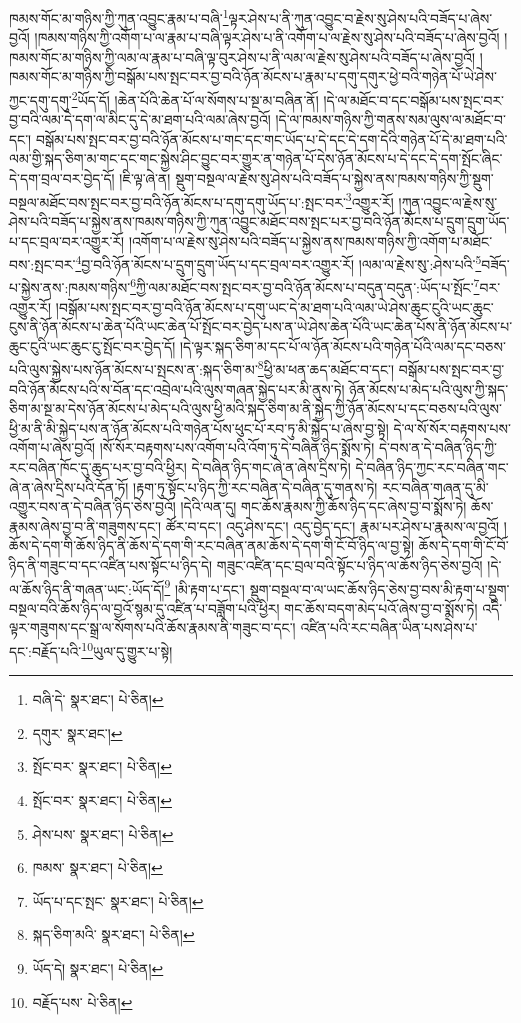 ཁམས་གོང་མ་གཉིས་ཀྱི་ཀུན་འབྱུང་རྣམ་པ་བཞི་\footnote{བཞི་དེ་  སྣར་ཐང་།  པེ་ཅིན། }ལྟར་ཤེས་པ་ནི་ཀུན་འབྱུང་བ་རྗེས་སུ་ཤེས་པའི་བཟོད་པ་ཞེས་བྱའོ། །ཁམས་གཉིས་ཀྱི་འགོག་པ་ལ་རྣམ་པ་བཞི་ལྟར་ཤེས་པ་ནི་འགོག་པ་ལ་རྗེས་སུ་ཤེས་པའི་བཟོད་པ་ཞེས་བྱའོ། །ཁམས་གོང་མ་གཉིས་ཀྱི་ལམ་ལ་རྣམ་པ་བཞི་ལྟ་བུར་ཤེས་པ་ནི་ལམ་ལ་རྗེས་སུ་ཤེས་པའི་བཟོད་པ་ཞེས་བྱའོ། །ཁམས་གོང་མ་གཉིས་ཀྱི་བསྒོམ་པས་སྤང་བར་བྱ་བའི་ཉོན་མོངས་པ་རྣམ་པ་དགུ་དགུར་ཕྱེ་བའི་གཉེན་པོ་ཡེ་ཤེས་ཀྱང་དགུ་དགུ་\footnote{དགུར་  སྣར་ཐང་། }ཡོད་དོ། །ཆེན་པོའི་ཆེན་པོ་ལ་སོགས་པ་སྔ་མ་བཞིན་ནོ། །དེ་ལ་མཐོང་བ་དང་བསྒོམ་པས་སྤང་བར་བྱ་བའི་ལམ་དེ་དག་ལ་མིང་དུ་དེ་མ་ཐག་པའི་ལམ་ཞེས་བྱའོ། །དེ་ལ་ཁམས་གཉིས་ཀྱི་གནས་སམ་ལུས་ལ་མཐོང་བ་དང་། བསྒོམ་པས་སྤང་བར་བྱ་བའི་ཉོན་མོངས་པ་གང་དང་གང་ཡོད་པ་དེ་དང་དེ་དག་དེའི་གཉེན་པོ་དེ་མ་ཐག་པའི་ལམ་གྱི་སྐད་ཅིག་མ་གང་དང་གང་སྐྱེས་ཤིང་བྱུང་བར་གྱུར་ན་གཉེན་པོ་དེས་ཉོན་མོངས་པ་དེ་དང་དེ་དག་སྤོང་ཞིང་དེ་དག་བྲལ་བར་བྱེད་དོ། །ཇི་ལྟ་ཞེ་ན། སྡུག་བསྔལ་ལ་རྗེས་སུ་ཤེས་པའི་བཟོད་པ་སྐྱེས་ནས་ཁམས་གཉིས་ཀྱི་སྡུག་བསྔལ་མཐོང་བས་སྤང་བར་བྱ་བའི་ཉོན་མོངས་པ་དགུ་དགུ་ཡོད་པ་:སྤང་བར་\footnote{སྤོང་བར་  སྣར་ཐང་།  པེ་ཅིན། }འགྱུར་རོ། །ཀུན་འབྱུང་ལ་རྗེས་སུ་ཤེས་པའི་བཟོད་པ་སྐྱེས་ནས་ཁམས་གཉིས་ཀྱི་ཀུན་འབྱུང་མཐོང་བས་སྤང་པར་བྱ་བའི་ཉོན་མོངས་པ་དྲུག་དྲུག་ཡོད་པ་དང་བྲལ་བར་འགྱུར་རོ། །འགོག་པ་ལ་རྗེས་སུ་ཤེས་པའི་བཟོད་པ་སྐྱེས་ནས་ཁམས་གཉིས་ཀྱི་འགོག་པ་མཐོང་བས་:སྤང་བར་\footnote{སྤོང་བར་  སྣར་ཐང་།  པེ་ཅིན། }བྱ་བའི་ཉོན་མོངས་པ་དྲུག་དྲུག་ཡོད་པ་དང་བྲལ་བར་འགྱུར་རོ། །ལམ་ལ་རྗེས་སུ་:ཤེས་པའི་\footnote{ཤེས་པས་  སྣར་ཐང་།  པེ་ཅིན། }བཟོད་པ་སྐྱེས་ནས་:ཁམས་གཉིས་\footnote{ཁམས་  སྣར་ཐང་།  པེ་ཅིན། }ཀྱི་ལམ་མཐོང་བས་སྤང་བར་བྱ་བའི་ཉོན་མོངས་པ་བདུན་བདུན་:ཡོད་པ་སྤོང་\footnote{ཡོད་པ་དང་སྤང་  སྣར་ཐང་།  པེ་ཅིན། }བར་འགྱུར་རོ། །བསྒོམ་པས་སྤང་བར་བྱ་བའི་ཉོན་མོངས་པ་དགུ་ཡང་དེ་མ་ཐག་པའི་ལམ་ཡེ་ཤེས་ཆུང་ངུའི་ཡང་ཆུང་ངུས་ནི་ཉོན་མོངས་པ་ཆེན་པོའི་ཡང་ཆེན་པོ་སྤོང་བར་བྱེད་པས་ན་ཡེ་ཤེས་ཆེན་པོའི་ཡང་ཆེན་པོས་ནི་ཉོན་མོངས་པ་ཆུང་ངུའི་ཡང་ཆུང་ངུ་སྤོང་བར་བྱེད་དོ། །དེ་ལྟར་སྐད་ཅིག་མ་དང་པོ་ལ་ཉོན་མོངས་པའི་གཉེན་པོའི་ལམ་དང་བཅས་པའི་ལུས་སྐྱེས་པས་ཉོན་མོངས་པ་སྤངས་ན་:སྐད་ཅིག་མ་\footnote{སྐད་ཅིག་མའི་  སྣར་ཐང་།  པེ་ཅིན། }ཕྱི་མ་ཕན་ཆད་མཐོང་བ་དང་། བསྒོམ་པས་སྤང་བར་བྱ་བའི་ཉོན་མོངས་པའི་ས་བོན་དང་འབྲེལ་པའི་ལུས་གཞན་སྐྱེད་པར་མི་ནུས་ཏེ། ཉོན་མོངས་པ་མེད་པའི་ལུས་ཀྱི་སྐད་ཅིག་མ་སྔ་མ་དེས་ཉོན་མོངས་པ་མེད་པའི་ལུས་ཕྱི་མའི་སྐད་ཅིག་མ་ནི་སྐྱེད་ཀྱི་ཉོན་མོངས་པ་དང་བཅས་པའི་ལུས་ཕྱི་མ་ནི་མི་སྐྱེད་པས་ན་ཉོན་མོངས་པའི་གཉེན་པོས་ཕུང་པོ་རབ་ཏུ་མི་སྐྱེད་པ་ཞེས་བྱ་སྟེ། དེ་ལ་སོ་སོར་བརྟགས་པས་འགོག་པ་ཞེས་བྱའོ། །སོ་སོར་བརྟགས་པས་འགོག་པའི་འོག་ཏུ་དེ་བཞིན་ཉིད་སྨོས་ཏེ། དེ་བས་ན་དེ་བཞིན་ཉིད་ཀྱི་རང་བཞིན་ཁོང་དུ་ཆུད་པར་བྱ་བའི་ཕྱིར། དེ་བཞིན་ཉིད་གང་ཞེ་ན་ཞེས་དྲིས་ཏེ། དེ་བཞིན་ཉིད་ཀྱང་རང་བཞིན་གང་ཞེ་ན་ཞེས་དྲིས་པའི་དོན་ཏོ། །རྟག་ཏུ་སྟོང་པ་ཉིད་ཀྱི་རང་བཞིན་དེ་བཞིན་དུ་གནས་ཏེ། རང་བཞིན་གཞན་དུ་མི་འགྱུར་བས་ན་དེ་བཞིན་ཉིད་ཅེས་བྱའོ། །དེའི་ལན་དུ། གང་ཆོས་རྣམས་ཀྱི་ཆོས་ཉིད་དང་ཞེས་བྱ་བ་སྨོས་ཏེ། ཆོས་རྣམས་ཞེས་བྱ་བ་ནི་གཟུགས་དང་། ཚོར་བ་དང་། འདུ་ཤེས་དང་། འདུ་བྱེད་དང་། རྣམ་པར་ཤེས་པ་རྣམས་ལ་བྱའོ། །ཆོས་དེ་དག་གི་ཆོས་ཉིད་ནི་ཆོས་དེ་དག་གི་རང་བཞིན་ནམ་ཆོས་དེ་དག་གི་ངོ་བོ་ཉིད་ལ་བྱ་སྟེ། ཆོས་དེ་དག་གི་ངོ་བོ་ཉིད་ནི་གཟུང་བ་དང་འཛིན་པས་སྟོང་པ་ཉིད་དེ། གཟུང་འཛིན་དང་བྲལ་བའི་སྟོང་པ་ཉིད་ལ་ཆོས་ཉིད་ཅེས་བྱའོ། །དེ་ལ་ཆོས་ཉིད་ནི་གཞན་ཡང་:ཡོད་དོ།\footnote{ཡོད་དེ།  སྣར་ཐང་།  པེ་ཅིན། } །མི་རྟག་པ་དང་། སྡུག་བསྔལ་བ་ལ་ཡང་ཆོས་ཉིད་ཅེས་བྱ་བས་མི་རྟག་པ་སྡུག་བསྔལ་བའི་ཆོས་ཉིད་ལ་བྱའོ་སྙམ་དུ་འཛིན་པ་བཟློག་པའི་ཕྱིར། གང་ཆོས་བདག་མེད་པའོ་ཞེས་བྱ་བ་སྨོས་ཏེ། འདི་ལྟར་གཟུགས་དང་སྒྲ་ལ་སོགས་པའི་ཆོས་རྣམས་ནི་གཟུང་བ་དང་། འཛིན་པའི་རང་བཞིན་ཡིན་པས་ཤེས་པ་དང་:བརྗོད་པའི་\footnote{བརྗོད་པས་  པེ་ཅིན། }ཡུལ་དུ་གྱུར་པ་སྟེ། 